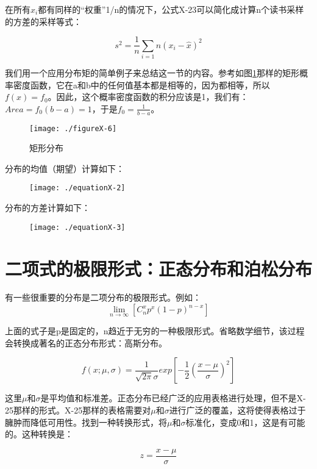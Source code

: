 \documentclass[cn,11pt,chinese]{elegantbook}
\begin{document}
{在所有$x_i$都有同样的“权重”1/n的情况下，公式X-23可以简化成计算n个读书采样的方差的采样等式：

\begin{equation}\label{eq10-24}
s^2=\frac{1}{n}\sum_{i=1}{n}(x_i-\hat{x})^2
\end{equation}



我们用一个应用分布矩的简单例子来总结这一节的内容。参考如图\ref{fig10-6}那样的矩形概率密度函数，它在a和b中的任何值基本都是相等的，因为都相等，所以$f(x)=f_0$。因此，这个概率密度函数的积分应该是1，我们有：
$Area=f_0(b-a)=1$，于是$f_0=\frac{1}{b-a}$。

\begin{figure}
	\texttt{[image: ./figureX-6]}
	\caption{矩形分布}\label{fig10-6}
\end{figure}



分布的均值（期望）计算如下：

\begin{figure}
	\texttt{[image: ./equationX-2]}
\end{figure}


分布的方差计算如下：

\begin{figure}
	\texttt{[image: ./equationX-3]}
\end{figure}

\section{二项式的极限形式：正态分布和泊松分布}

有一些很重要的分布是二项分布的极限形式。例如：
$$
\lim_{n\to \infty}[C_n^x p^x(1-p)^{n-x}]
$$

上面的式子是p是固定的，n趋近于无穷的一种极限形式。省略数学细节，该过程会转换成著名的正态分布形式：高斯分布。


\begin{equation}\label{eq10-25}
f(x;\mu,\sigma)=\frac{1}{\sqrt{2\pi}\sigma}exp[-\frac{1}{2}(\frac{x-\mu}{\sigma})^2] 
\end{equation}

这里$\mu$和$\sigma$是平均值和标准差。正态分布已经广泛的应用表格进行处理，但不是X-25那样的形式。X-25那样的表格需要对$\mu$和$\sigma$进行广泛的覆盖，这将使得表格过于臃肿而降低可用性。找到一种转换形式，将$\mu$和$\sigma$标准化，变成0和1，这是有可能的。这种转换是：

\begin{equation}\label{eq10-26}
z=\frac{x-\mu}{\sigma}
\end{equation}


}
\end{document}
